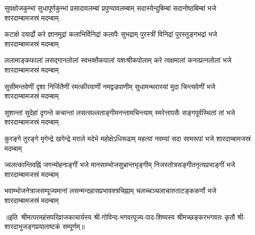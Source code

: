 

\fourlineindentedshloka
{सुवक्षोजकुम्भां सुधापूर्णकुम्भां}
{प्रसादावलम्बां प्रपुण्यावलम्बाम्}
{सदास्येन्दुबिम्बां सदानोष्ठबिम्बां}
{भजे शारदाम्बामजस्रं मदम्बाम्}

\fourlineindentedshloka
{कटाक्षे दयार्द्रो करे ज्ञानमुद्रां}
{कलाभिर्विनिद्रां कलापैः सुभद्राम्}
{पुरस्त्रीं विनिद्रां पुरस्तुङ्गभद्रां}
{भजे शारदाम्बामजस्रं मदम्बाम्}

\fourlineindentedshloka
{ललामाङ्कफालां लसद्गानलोलां}
{स्वभक्तैकपालां यशःश्रीकपोलाम्}
{करे त्वक्षमालां कनत्प्रत्नलोलां}
{भजे शारदाम्बामजस्रं मदम्बाम्}

\fourlineindentedshloka
{सुसीमन्तवेणीं दृशा निर्जितैणीं}
{रमत्कीरवाणीं नमद्वज्रपाणीम्}
{सुधामन्थरास्यां मुदा चिन्त्यवेणीं}
{भजे शारदाम्बामजस्रं मदम्बाम्}

\fourlineindentedshloka
{सुशान्तां सुदेहां दृगन्ते कचान्तां}
{लसत्सल्लताङ्गीमनन्तामचिन्त्याम्}
{स्मरेत्तापसैः सङ्गपूर्वस्थितां तां}
{भजे शारदाम्बामजस्रं मदम्बाम्}

\fourlineindentedshloka
{कुरङ्गे तुरङ्गे मृगेन्द्रे खगेन्द्रे}
{मराले मदेभे महोक्षेऽधिरूढाम्}
{महत्यां नवम्यां सदा सामरूपां}
{भजे शारदाम्बामजस्रं मदम्बाम्}

\fourlineindentedshloka
{ज्वलत्कान्तिवह्निं जगन्मोहनाङ्गीं}
{भजे मानसाम्भोजसुभ्रान्तभृङ्गीम्}
{निजस्तोत्रसङ्गीतनृत्यप्रभाङ्गीं}
{भजे शारदाम्बामजस्रं मदम्बाम्}

\fourlineindentedshloka
{भवाम्भोजनेत्राजसम्पूज्यमानां}
{लसन्मन्दहासप्रभावक्त्रचिह्नाम्}
{चलच्चञ्चलाचारुताटङ्ककर्णो}
{भजे शारदाम्बामजस्रं मदम्बाम्}

॥इति~श्रीमत्परमहंसपरिव्राजकाचार्यस्य श्री-गोविन्द-भगवत्पूज्य-पाद-शिष्यस्य
श्रीमच्छङ्करभगवतः कृतौ श्री-शारदाभुजङ्गप्रयाताष्टकं सम्पूर्णम्॥